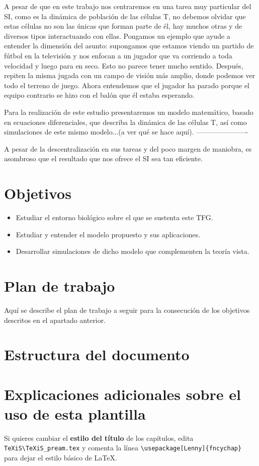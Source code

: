 A pesar de que en este trabajo nos centraremos en una tarea muy particular del SI, como es la dinámica de población de las células T, no debemos olvidar que estas células no son las únicas que forman parte de él, hay muchos otras y de diversos tipos interactuando con ellas. Pongamos un ejemplo que ayude a entender la dimensión del asunto: supongamos que estamos viendo un partido de fútbol en la televisión y nos enfocan a un jugador que va corriendo a toda velocidad y luego para en seco. Esto no parece tener mucho sentido. Después, repiten la misma jugada con un campo de visión más amplio, donde podemos ver todo el terreno de juego. Ahora entendemos que el jugador ha parado porque el equipo contrario se hizo con el balón que él estaba esperando. 

Para la realización de este estudio presentaremos un modelo matemático, basado en ecuaciones diferenciales, que describa la dinámica de las células T, así como simulaciones de este mismo modelo...(a ver qué se hace aquí).
----------------------

A pesar de la descentralización en sus tareas y del poco margen de maniobra, es asombroso que el resultado que nos ofrece el SI sea tan eficiente.

\section{Objetivos}
 \begin{itemize}
 	\item Estudiar el entorno biológico sobre el que se sustenta este TFG.
 	\item Estudiar y entender el modelo propuesto y sus aplicaciones. 
 	\item Desarrollar simulaciones de dicho modelo que complementen la teoría vista.
 \end{itemize}


\section{Plan de trabajo}
Aquí se describe el plan de trabajo a seguir para la consecución de los objetivos descritos en el apartado anterior.

\section{Estructura del documento}

\section{Explicaciones adicionales sobre el uso de esta plantilla}
Si quieres cambiar el \textbf{estilo del título} de los capítulos, edita \verb|TeXiS\TeXiS_pream.tex| y comenta la línea \verb|\usepackage[Lenny]{fncychap}| para dejar el estilo básico de \LaTeX.

